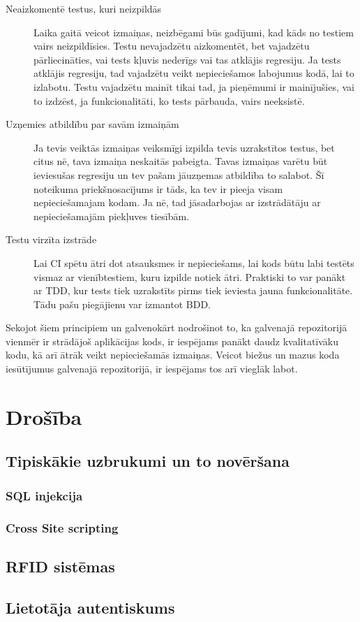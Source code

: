 \begin{description}
	\item [Neaizkomentē testus, kuri neizpildās] Laika gaitā veicot izmaiņas, neizbēgami būs gadījumi, kad kāds no testiem vairs neizpildīsies. Testu nevajadzētu aizkomentēt, bet vajadzētu pārliecināties, vai tests kļuvis nederīgs vai tas atklājis regresiju. Ja tests atklājis regresiju, tad vajadzētu veikt nepieciešamos labojumus kodā, lai to izlabotu. Testu vajadzētu mainīt tikai tad, ja pieņēmumi ir mainījušies, vai to izdzēst, ja funkcionalitāti, ko tests pārbauda, vairs neeksistē.
	\item [Uzņemies atbildību par savām izmaiņām] Ja tevis veiktās izmaiņas veiksmīgi izpilda tevis uzrakstītos testus, bet citus nē, tava izmaiņa neskaitās pabeigta. Tavas izmaiņas varētu būt ieviesušas regresiju un tev pašam jāuzņemas atbildība to salabot. Šī noteikuma priekšnosacījums ir tāds, ka tev ir pieeja visam nepieciešamajam kodam. Ja nē, tad jāsadarbojas ar izstrādātāju ar nepieciešamajām piekļuves tiesībām.
	\item [Testu virzīta izstrāde] Lai CI spētu ātri dot atsauksmes ir nepieciešams, lai kods būtu labi testēts vismaz ar vienībtestiem, kuru izpilde notiek ātri. Praktiski to var panākt ar TDD, kur tests tiek uzrakstīts pirms tiek ieviesta jauna funkcionalitāte. Tādu pašu piegājienu var izmantot BDD.
\end{description}
Sekojot šiem principiem un galvenokārt nodrošinot to, ka galvenajā repozitorijā vienmēr ir strādājoš aplikācijas kods, ir iespējams panākt daudz kvalitatīvāku kodu, kā arī ātrāk veikt nepieciešamās izmaiņas. Veicot biežus un mazus koda iesūtījumus galvenajā repozitorijā, ir iespējams tos arī vieglāk labot.


\chapter{Drošība}

\section{Tipiskākie uzbrukumi un to novēršana}
\subsection{SQL injekcija}
\subsection{Cross Site scripting}

\section{RFID sistēmas}
\section{Lietotāja autentiskums}
